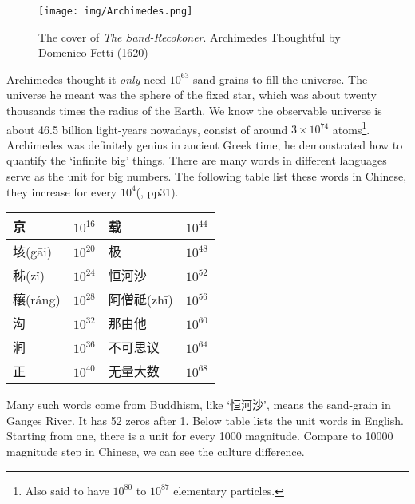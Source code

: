 \documentclass{article}
\begin{document}
\begin{figure}[htbp]
 \centering
 \texttt{[image: img/Archimedes.png]}
 \captionsetup{labelformat=empty}
 \caption{The cover of {\em The Sand-Recokoner}. Archimedes Thoughtful by Domenico Fetti (1620)}
 \label{fig:Archimedes}
\end{figure}

Archimedes thought it {\em only} need $10^{63}$ sand-grains to fill the universe. The universe he meant was the sphere of the fixed star, which was about twenty thousands times the radius of the Earth. We know the observable universe is about 46.5 billion light-years nowadays, consist of around $3 \times 10^{74}$ atoms\footnote{Also said to have $10^{80}$ to $10^{87}$ elementary particles.}. Archimedes was definitely genius in ancient Greek time, he demonstrated how to quantify the `infinite big' things. There are many words in different languages serve as the unit for big numbers. The following table list these words in Chinese, they increase for every $10^4$(\cite{Noguchi2007}, pp31).

\begin{center}
\begin{tabular}{|l|r|l|r|}
\hline
京            & $10^{16}$ & 载            & $10^{44}$ \\
\hline
垓(g\={a}i)   & $10^{20}$ & 极            & $10^{48}$ \\
\hline
秭(z\v{i})    & $10^{24}$ & 恒河沙  & $10^{52}$ \\
\hline
穰(r\'{a}ng)  & $10^{28}$ & 阿僧祗(zh\={i})  & $10^{56}$ \\
\hline
沟            & $10^{32}$ & 那由他        & $10^{60}$ \\
\hline
涧            & $10^{36}$ & 不可思议      & $10^{64}$ \\
\hline
正            & $10^{40}$ & 无量大数      & $10^{68}$ \\
\hline
\end{tabular}
\end{center}

Many such words come from Buddhism, like `恒河沙', means the sand-grain in Ganges River. It has 52 zeros after 1. Below table lists the unit words in English. Starting from one, there is a unit for every 1000 magnitude. Compare to 10000 magnitude step in Chinese, we can see the culture difference.
\end{document}
